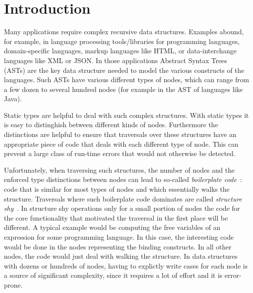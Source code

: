 \section{Introduction}

Many applications require complex recursive data structures. Examples
abound, for example, in language processing tools/libraries for programming
languages, domain-specific languages, markup languages like HTML, or
data-interchange languages like XML or JSON. In those applications
Abstract Syntax Trees (ASTs) are the key data structure needed to
model the various constructs of the languages. Such ASTs have various
different types of nodes, which can range from a few dozen to
several hundred nodes (for example in the AST of languages like Java).

Static types are helpful to deal with such complex structures.  With
static types it is easy to distinghish between different kinds of
nodes. Furthermore the distinctions are helpful to ensure that
traversals over these structures have an appropriate piece of code that
deals with each different type of node. This can prevent a large class
of run-time errors that would not otherwise be detected.


Unfortunately, when traversing such structures, the number of nodes and the
enforced type distinctions between nodes can lead to so-called
\emph{boilerplate code}~\cite{ralf03syb}: code that is similar for most types of nodes and which
essentially walks the structure. Traversals where such boilerplate
code dominates are called \emph{structure shy}~\cite{DemeterBook}. In
structure shy operations only for a small portion of nodes the code
for the core functionality that motivated the traversal in the first
place will be different. A typical example would be computing the free
variables of an expression for some programming language. In this
case, the interesting code would be done in the nodes representing the
binding constructs. In all other nodes, the code would just deal with
walking the structure. In data structures with dozens or hundreds of
nodes, having to explictly write cases for each node is a source of
significant complexity, since it requires a lot of effort and it is
error-prone.

